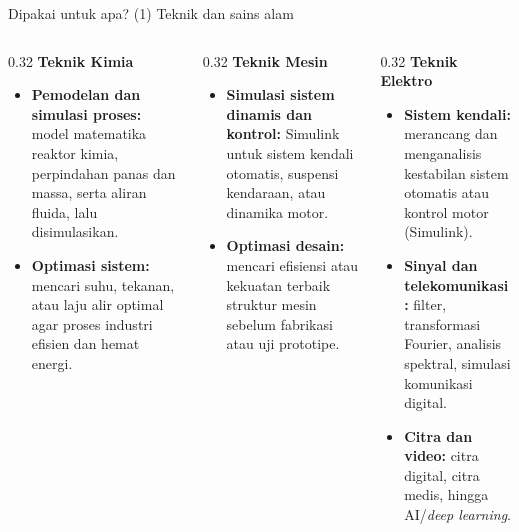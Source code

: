 \documentclass[aspectratio=169,11pt]{beamer}
\begin{document}
\begin{frame}{Dipakai untuk apa? (1) Teknik dan sains alam}
\footnotesize
\begin{columns}[T]
\begin{column}{0.32\textwidth}
\textbf{Teknik Kimia}
\begin{itemize}
  \item \textbf{Pemodelan dan simulasi proses:} model matematika reaktor
        kimia, perpindahan panas dan massa, serta aliran fluida, lalu
        disimulasikan.
  \item \textbf{Optimasi sistem:} mencari suhu, tekanan, atau laju alir
        optimal agar proses industri efisien dan hemat energi.
\end{itemize}
\end{column}
\begin{column}{0.32\textwidth}
\textbf{Teknik Mesin}
\begin{itemize}
  \item \textbf{Simulasi sistem dinamis dan kontrol:} Simulink untuk
        sistem kendali otomatis, suspensi kendaraan, atau dinamika motor.
  \item \textbf{Optimasi desain:} mencari efisiensi atau kekuatan terbaik
        struktur mesin sebelum fabrikasi atau uji prototipe.
\end{itemize}
\end{column}
\begin{column}{0.32\textwidth}
\textbf{Teknik Elektro}
\begin{itemize}
  \item \textbf{Sistem kendali:} merancang dan menganalisis kestabilan
        sistem otomatis atau kontrol motor (Simulink).
  \item \textbf{Sinyal dan telekomunikasi:} filter, transformasi Fourier,
        analisis spektral, simulasi komunikasi digital.
  \item \textbf{Citra dan video:} citra digital, citra medis, hingga
        AI/\emph{deep learning}.
\end{itemize}
\end{column}
\end{columns}
\end{frame}
\end{document}
